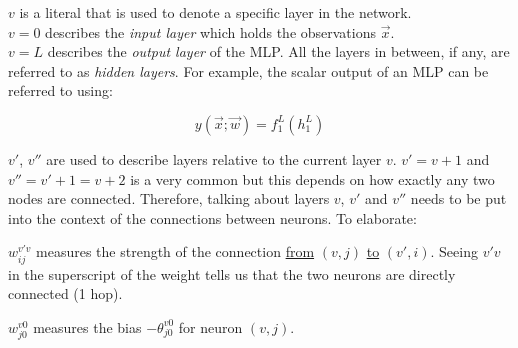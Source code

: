 \begin{frame}
{$v$ is a literal that is used to denote a specific layer in the network.\\
$v=0$ describes the \emph{input layer} which holds the observations $\vec x$.\\
$v=L$ describes the \emph{output layer} of the MLP. All the layers in between, if any, are referred to as \emph{hidden layers}. For example, the scalar output of an MLP can be referred to using:


\begin{equation}
y(\vec x;\vec w) = f^L_1(h^L_1)
\end{equation}

$v'$, $v''$ are used to describe layers relative to the current layer $v$. $v'=v+1$ and $v''=v'+1=v+2$ is a very common but this depends on how exactly any two nodes are connected. Therefore, talking about layers $v$, $v'$ and $v''$ needs to be put into the context of the connections between neurons. To elaborate:

$w_{ij}^{v'v}$ measures the strength of the connection \underline{from} $(v,j)$ \underline{to} $(v',i)$. Seeing $v'v$ in the superscript of the weight tells us that the two neurons are directly connected (1 hop).

$w_{j0}^{v0}$ measures the bias $-\theta_{j0}^{v0}$ for neuron $(v,j)$. 

}

\end{frame}

